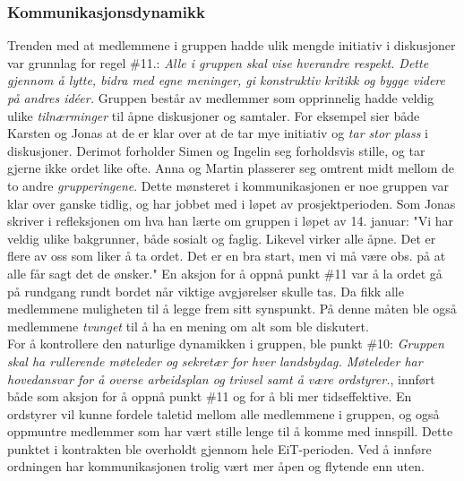 \subsubsection{Kommunikasjonsdynamikk}

Trenden med at medlemmene i gruppen hadde ulik mengde initiativ i diskusjoner var grunnlag for regel \#11.: \textit{Alle i gruppen skal vise hverandre respekt. Dette gjennom å lytte, bidra med egne meninger, gi konstruktiv kritikk og bygge videre på andres id\'{e}er.} 
Gruppen består av medlemmer som opprinnelig hadde veldig ulike \textit{tilnærminger} til åpne diskusjoner og samtaler.
For eksempel sier både Karsten og Jonas at de er klar over at de tar mye initiativ og \textit{tar stor plass} i diskusjoner.
Derimot forholder Simen og Ingelin seg forholdsvis stille, og tar gjerne ikke ordet like ofte.
Anna og Martin plasserer seg omtrent midt mellom de to andre \textit{grupperingene}.
Dette mønsteret i kommunikasjonen er noe gruppen var klar over ganske tidlig, og har jobbet med i løpet av prosjektperioden.
Som Jonas skriver i refleksjonen om hva han lærte om gruppen i løpet av 14. januar:
"Vi har veldig ulike bakgrunner, både sosialt og faglig. Likevel virker alle åpne. Det er flere av oss som liker å ta ordet. Det er en bra start, men vi må være obs. på at alle får sagt det de ønsker."
En aksjon for å oppnå punkt \#11 var å la ordet gå på rundgang rundt bordet når viktige avgjørelser skulle tas. Da fikk alle medlemmene muligheten til å legge frem sitt synspunkt. På denne måten ble også medlemmene \textit{tvunget} til å ha en mening om alt som ble diskutert. \\

For å kontrollere den naturlige dynamikken i gruppen, ble punkt \#10: \textit{Gruppen skal ha rullerende møteleder og sekretær for hver landsbydag. Møteleder har hovedansvar for å overse arbeidsplan og trivsel samt å være ordstyrer.}, innført både som aksjon for å oppnå punkt \#11 og for å bli mer tidseffektive. En ordstyrer vil kunne fordele taletid mellom alle medlemmene i gruppen, og også oppmuntre medlemmer som har vært stille lenge til å komme med innspill. Dette punktet i kontrakten ble overholdt gjennom hele EiT-perioden. Ved å innføre ordningen har kommunikasjonen trolig vært mer åpen og flytende enn uten.
